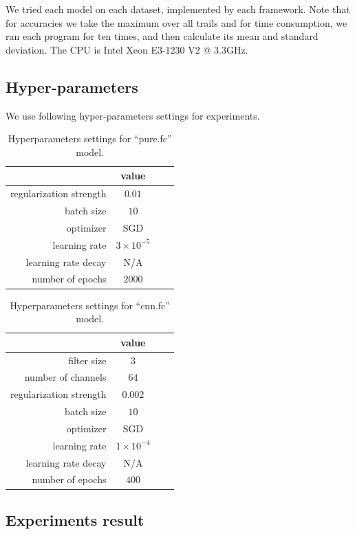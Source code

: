 \documentclass[a4paper]{article}
\begin{document}
We tried each model on each dataset, implemented by each framework.
Note that for accuracies we take the maximum over all trails and for time consumption, we ran each program for ten times, and then calculate its mean and standard deviation.
The CPU is Intel Xeon E3-1230 V2 @ 3.3GHz.

\subsection{Hyper-parameters}
We use following hyper-parameters settings for experiments.
\begin{table}[H]
\centering
\begin{tabular}{|r|c|c|c|}
\hline
 & value \\
\hline
regularization strength & $0.01$ \\
\hline
batch size & $10$ \\
\hline
optimizer & SGD \\
\hline
learning rate & $3\times10^{-5}$\\
\hline
learning rate decay & N/A \\
\hline
number of epochs & $2000$ \\
\hline
\end{tabular}
\caption{Hyperparameters settings for ``pure.fc'' model.}
\end{table}

\begin{table}[H]
\centering
\begin{tabular}{|r|c|c|c|}
\hline
 & value \\
\hline
filter size & $3$ \\
\hline
number of channels & $64$ \\
\hline
regularization strength & $0.002$ \\
\hline
batch size & $10$ \\
\hline
optimizer & SGD \\
\hline
learning rate & $1\times10^{-4}$\\
\hline
learning rate decay & N/A \\
\hline
number of epochs & $400$ \\
\hline
\end{tabular}
\caption{Hyperparameters settings for ``cnn.fc'' model.}
\end{table}

\subsection{Experiments result}
\end{document}
